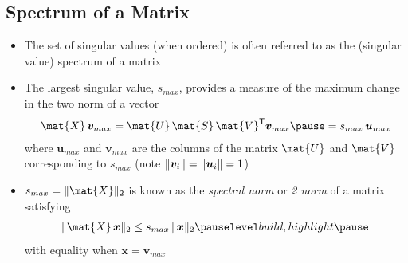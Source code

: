 \begin{slide}
\section[-2]{Spectrum of a Matrix}

\begin{PauseHighLight}\squeeze
  \begin{itemize}
  \item The set of singular values (when ordered) is often referred
    to as the (singular value) spectrum of a matrix\pause
  \item The largest singular value, $s_{max}$, provides a measure of
    the maximum change in the two norm of a vector
    \begin{align*}
      \mat{X}\,\bm{v}_{max} = \mat{U}\, \mat{S} \, \mat{V}^\tr
      \bm{v}_{max} \pause
      = s_{max} \, \bm{u}_{max}
    \end{align*}
    where $\bm{u}_{max}$ and $\bm{v}_{max}$ are the columns of the
    matrix $\mat{U}$ and $\mat{V}$ corresponding to $s_{max}$\pauseb{}
    (note $\| \bm{v}_i \| = \| \bm{u}_i \| = 1$)\pauseb
  \item $s_{max} = \len{\mat{X}}_2$ is known as the \emph{spectral norm} or \emph{2
      norm} of a matrix satisfying
    \vspace*{-1cm}
    \begin{align*}
      \len{\mat{X}\, \bm{x}}_2 \leq s_{max} \, \len{\bm{x}}_2\pauseb
    \end{align*}
    with equality when $\bm{x} = \bm{v}_{max}$\pauseb
  \end{itemize}
\end{PauseHighLight}

\end{slide}





